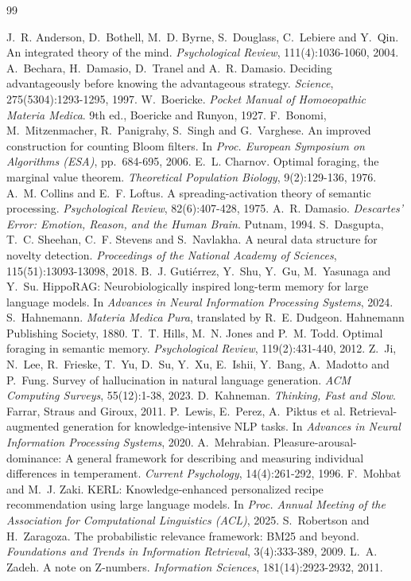 \documentclass[12pt,a4paper,oneside]{report}
\begin{document}
\clearpage
\begin{thebibliography}{99}
\small
{} J.~R. Anderson, D.~Bothell, M.~D. Byrne, S.~Douglass, C.~Lebiere and Y.~Qin. An integrated theory of the mind. \emph{Psychological Review}, 111(4):1036-1060, 2004.
 A.~Bechara, H.~Damasio, D.~Tranel and A.~R. Damasio. Deciding advantageously before knowing the advantageous strategy. \emph{Science}, 275(5304):1293-1295, 1997.
 W.~Boericke. \emph{Pocket Manual of Homoeopathic Materia Medica}. 9th ed., Boericke and Runyon, 1927.
 F.~Bonomi, M.~Mitzenmacher, R.~Panigrahy, S.~Singh and G.~Varghese. An improved construction for counting Bloom filters. In \emph{Proc. European Symposium on Algorithms (ESA)}, pp.~684-695, 2006.
 E.~L. Charnov. Optimal foraging, the marginal value theorem. \emph{Theoretical Population Biology}, 9(2):129-136, 1976.
 A.~M. Collins and E.~F. Loftus. A spreading-activation theory of semantic processing. \emph{Psychological Review}, 82(6):407-428, 1975.
 A.~R. Damasio. \emph{Descartes' Error: Emotion, Reason, and the Human Brain}. Putnam, 1994.
 S.~Dasgupta, T.~C. Sheehan, C.~F. Stevens and S.~Navlakha. A neural data structure for novelty detection. \emph{Proceedings of the National Academy of Sciences}, 115(51):13093-13098, 2018.
 B.~J. Guti\'errez, Y.~Shu, Y.~Gu, M.~Yasunaga and Y.~Su. HippoRAG: Neurobiologically inspired long-term memory for large language models. In \emph{Advances in Neural Information Processing Systems}, 2024.
 S.~Hahnemann. \emph{Materia Medica Pura}, translated by R.~E. Dudgeon. Hahnemann Publishing Society, 1880.
 T.~T. Hills, M.~N. Jones and P.~M. Todd. Optimal foraging in semantic memory. \emph{Psychological Review}, 119(2):431-440, 2012.
 Z.~Ji, N.~Lee, R.~Frieske, T.~Yu, D.~Su, Y.~Xu, E.~Ishii, Y.~Bang, A.~Madotto and P.~Fung. Survey of hallucination in natural language generation. \emph{ACM Computing Surveys}, 55(12):1-38, 2023.
 D.~Kahneman. \emph{Thinking, Fast and Slow}. Farrar, Straus and Giroux, 2011.
 P.~Lewis, E.~Perez, A.~Piktus et al. Retrieval-augmented generation for knowledge-intensive NLP tasks. In \emph{Advances in Neural Information Processing Systems}, 2020.
 A.~Mehrabian. Pleasure-arousal-dominance: A general framework for describing and measuring individual differences in temperament. \emph{Current Psychology}, 14(4):261-292, 1996.
 F.~Mohbat and M.~J. Zaki. KERL: Knowledge-enhanced personalized recipe recommendation using large language models. In \emph{Proc. Annual Meeting of the Association for Computational Linguistics (ACL)}, 2025.
 S.~Robertson and H.~Zaragoza. The probabilistic relevance framework: BM25 and beyond. \emph{Foundations and Trends in Information Retrieval}, 3(4):333-389, 2009.
 L.~A. Zadeh. A note on Z-numbers. \emph{Information Sciences}, 181(14):2923-2932, 2011.
\end{thebibliography}
\end{document}

